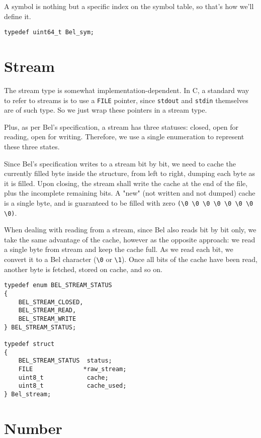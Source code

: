\documentclass[openright,a4paper,twoside,12pt]{memoir}
\begin{document}
A symbol is nothing but a specific index on the symbol table, so
that's how we'll define it.

\begin{verbatim}
typedef uint64_t Bel_sym;
\end{verbatim}

\section{Stream}
\label{sec:org805b894}

The stream type is somewhat implementation-dependent. In C, a standard
way to refer to streams is to use a \texttt{FILE} pointer, since \texttt{stdout} and
\texttt{stdin} themselves are of such type. So we just wrap these pointers in
a stream type.

Plus, as per Bel's specification, a stream has three statuses: closed,
open for reading, open for writing. Therefore, we use a single
enumeration to represent these three states.

Since Bel's specification writes to a stream bit by bit, we need to
cache the currently filled byte inside the structure, from left to
right, dumping each byte as it is filled. Upon closing, the stream
shall write the cache at the end of the file, plus the incomplete
remaining bits. A "new" (not written and not dumped) cache is a single
byte, and is guaranteed to be filled with zero \texttt{(\textbackslash{}0 \textbackslash{}0 \textbackslash{}0 \textbackslash{}0 \textbackslash{}0 \textbackslash{}0 \textbackslash{}0
\textbackslash{}0)}.

When dealing with reading from a stream, since Bel also reads bit by
bit only, we take the same advantage of the cache, however as the
opposite approach: we read a single byte from stream and keep the
cache full. As we read each bit, we convert it to a Bel character (\texttt{\textbackslash{}0}
or \texttt{\textbackslash{}1}). Once all bits of the cache have been read, another byte is
fetched, stored on cache, and so on.

\begin{verbatim}
typedef enum BEL_STREAM_STATUS
{
    BEL_STREAM_CLOSED,
    BEL_STREAM_READ,
    BEL_STREAM_WRITE
} BEL_STREAM_STATUS;

typedef struct
{
    BEL_STREAM_STATUS  status;
    FILE              *raw_stream;
    uint8_t            cache;
    uint8_t            cache_used;
} Bel_stream;
\end{verbatim}

\section{Number}
\label{sec:org8e0a66e}
\end{document}
